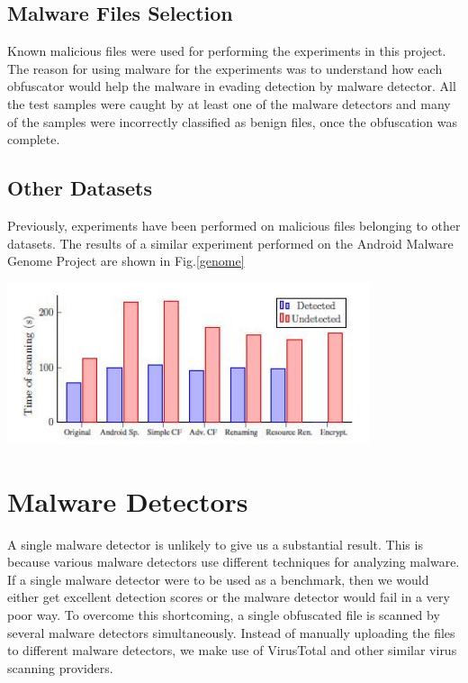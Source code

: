 	\subsection{Malware Files Selection}
		Known malicious files were used for performing the experiments in this project. The reason for using malware for the experiments was to understand how each obfuscator would help the malware in evading detection by malware detector. All the test samples were caught by at least one of the malware detectors and many of the samples were incorrectly classified as benign files, once the obfuscation was complete.

	\subsection{Other Datasets}
		Previously, experiments have been performed on malicious files belonging to other datasets. The results of a similar experiment performed on the Android
		Malware Genome Project \cite{zhou} are shown in Fig.\ref{genome}\cite{aamo}

		 \vspace{3mm}
		 \begin{center}
		 	\includegraphics[width=0.8\textwidth]{genome.jpg}
		 	\label{genome}
		\end{center}
		\vspace{3mm}
		
		
\section{Malware Detectors}
	A single malware detector is unlikely to give us a substantial result. This is because various malware detectors use different techniques for analyzing malware. If a single malware detector were to be used as a benchmark, then we would either get excellent detection scores or the malware detector would fail in a very poor way. To  overcome this shortcoming, a single obfuscated file is scanned by several malware detectors simultaneously.
	Instead of manually uploading the files to different malware detectors, we make use of VirusTotal\cite{virusTotal} and other similar virus scanning providers.